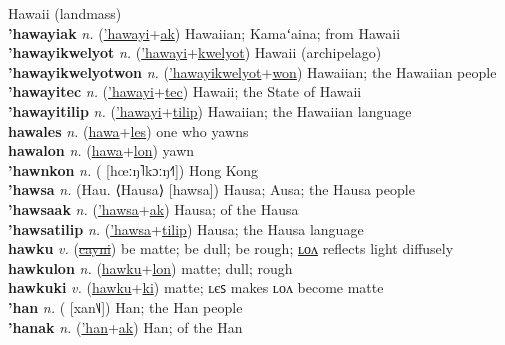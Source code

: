 Hawaii (landmass) \label{'hawayi} \\
\textbf{'hawayiak} \textit{n.} (\hyperref['hawayi]{'hawayi}+\hyperref[ak]{ak})
Hawaiian; Kamaʻaina; from Hawaii \label{'hawayiak} \\
\textbf{'hawayikwelyot} \textit{n.} (\hyperref['hawayi]{'hawayi}+\hyperref[kwelyot]{kwelyot})
Hawaii (archipelago) \label{'hawayikwelyot} \\
\textbf{'hawayikwelyotwon} \textit{n.} (\hyperref['hawayikwelyot]{'hawayikwelyot}+\hyperref[won]{won})
Hawaiian; the Hawaiian people \label{'hawayikwelyotwon} \\
\textbf{'hawayitec} \textit{n.} (\hyperref['hawayi]{'hawayi}+\hyperref[tec]{tec})
Hawaii; the State of Hawaii \label{'hawayitec} \\
\textbf{'hawayitilip} \textit{n.} (\hyperref['hawayi]{'hawayi}+\hyperref[tilip]{tilip})
Hawaiian; the Hawaiian language \label{'hawayitilip} \\
\textbf{hawales} \textit{n.} (\hyperref[hawa]{hawa}+\hyperref[les]{les})
one who yawns \label{hawales} \\
\textbf{hawalon} \textit{n.} (\hyperref[hawa]{hawa}+\hyperref[lon]{lon})
yawn \label{hawalon} \\
\textbf{'hawnkon} \textit{n.} ( [hœːŋ˥kɔːŋ˧˥])
Hong Kong \label{'hawnkon} \\
\textbf{'hawsa} \textit{n.} (Hau. ⟨Hausa⟩ [hawsa])
Hausa; Ausa; the Hausa people \label{'hawsa} \\
\textbf{'hawsaak} \textit{n.} (\hyperref['hawsa]{'hawsa}+\hyperref[ak]{ak})
Hausa; of the Hausa \label{'hawsaak} \\
\textbf{'hawsatilip} \textit{n.} (\hyperref['hawsa]{'hawsa}+\hyperref[tilip]{tilip})
Hausa; the Hausa language \label{'hawsatilip} \\
\textbf{hawku} \textit{v.} (\hyperref[cayni]{\sout{cayni}})
be matte; be dull; be rough; \hyperref[hawkulon]{ʟᴏᴧ} reflects light diffusely \label{hawku} \\
\textbf{hawkulon} \textit{n.} (\hyperref[hawku]{hawku}+\hyperref[lon]{lon})
matte; dull; rough \label{hawkulon} \\
\textbf{hawkuki} \textit{v.} (\hyperref[hawku]{hawku}+\hyperref[ki]{ki})
matte; ʟєꜱ makes ʟᴏᴧ become matte \label{hawkuki} \\
\textbf{'han} \textit{n.} ( [xan˥˩])
Han; the Han people \label{'han} \\
\textbf{'hanak} \textit{n.} (\hyperref['han]{'han}+\hyperref[ak]{ak})
Han; of the Han \label{'hanak} \\
